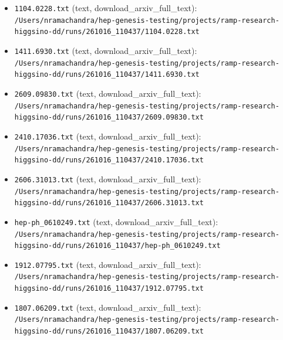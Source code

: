 \documentclass[11pt,a4paper]{article}
\begin{document}
\begin{itemize}
  \item \texttt{1104.0228.txt} (text, download\_arxiv\_full\_text): \texttt{/\allowbreak{}Users/\allowbreak{}nramachandra/\allowbreak{}hep-genesis-testing/\allowbreak{}projects/\allowbreak{}ramp-research-higgsino-dd/\allowbreak{}runs/\allowbreak{}261016\_\allowbreak{}110437/\allowbreak{}1104.0228.txt}
  \item \texttt{1411.6930.txt} (text, download\_arxiv\_full\_text): \texttt{/\allowbreak{}Users/\allowbreak{}nramachandra/\allowbreak{}hep-genesis-testing/\allowbreak{}projects/\allowbreak{}ramp-research-higgsino-dd/\allowbreak{}runs/\allowbreak{}261016\_\allowbreak{}110437/\allowbreak{}1411.6930.txt}
  \item \texttt{2609.09830.txt} (text, download\_arxiv\_full\_text): \texttt{/\allowbreak{}Users/\allowbreak{}nramachandra/\allowbreak{}hep-genesis-testing/\allowbreak{}projects/\allowbreak{}ramp-research-higgsino-dd/\allowbreak{}runs/\allowbreak{}261016\_\allowbreak{}110437/\allowbreak{}2609.09830.txt}
  \item \texttt{2410.17036.txt} (text, download\_arxiv\_full\_text): \texttt{/\allowbreak{}Users/\allowbreak{}nramachandra/\allowbreak{}hep-genesis-testing/\allowbreak{}projects/\allowbreak{}ramp-research-higgsino-dd/\allowbreak{}runs/\allowbreak{}261016\_\allowbreak{}110437/\allowbreak{}2410.17036.txt}
  \item \texttt{2606.31013.txt} (text, download\_arxiv\_full\_text): \texttt{/\allowbreak{}Users/\allowbreak{}nramachandra/\allowbreak{}hep-genesis-testing/\allowbreak{}projects/\allowbreak{}ramp-research-higgsino-dd/\allowbreak{}runs/\allowbreak{}261016\_\allowbreak{}110437/\allowbreak{}2606.31013.txt}
  \item \texttt{hep-ph\_\allowbreak{}0610249.txt} (text, download\_arxiv\_full\_text): \texttt{/\allowbreak{}Users/\allowbreak{}nramachandra/\allowbreak{}hep-genesis-testing/\allowbreak{}projects/\allowbreak{}ramp-research-higgsino-dd/\allowbreak{}runs/\allowbreak{}261016\_\allowbreak{}110437/\allowbreak{}hep-ph\_\allowbreak{}0610249.txt}
  \item \texttt{1912.07795.txt} (text, download\_arxiv\_full\_text): \texttt{/\allowbreak{}Users/\allowbreak{}nramachandra/\allowbreak{}hep-genesis-testing/\allowbreak{}projects/\allowbreak{}ramp-research-higgsino-dd/\allowbreak{}runs/\allowbreak{}261016\_\allowbreak{}110437/\allowbreak{}1912.07795.txt}
  \item \texttt{1807.06209.txt} (text, download\_arxiv\_full\_text): \texttt{/\allowbreak{}Users/\allowbreak{}nramachandra/\allowbreak{}hep-genesis-testing/\allowbreak{}projects/\allowbreak{}ramp-research-higgsino-dd/\allowbreak{}runs/\allowbreak{}261016\_\allowbreak{}110437/\allowbreak{}1807.06209.txt}

\end{itemize}
\end{document}
